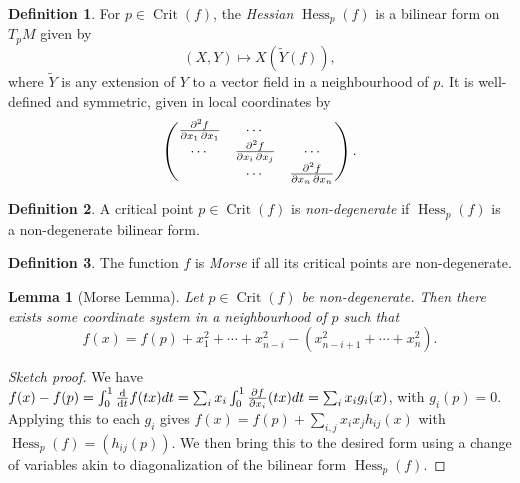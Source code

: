\documentclass{article}
\newtheorem*{lemma}{Lemma}
\theoremstyle{definition}
\newtheorem*{definition}{Definition}
\DeclareMathOperator{\Crit}{Crit}
\DeclareMathOperator{\Hess}{Hess}
\begin{document}
\begin{definition}
    For $p\in\Crit(f)$, the \emph{Hessian} $\Hess_p(f)$ is a bilinear form on
    $T_pM$ given by
    \begin{equation*}
        (X,Y) \mapsto X(\widetilde Y(f)),
    \end{equation*}
    where $\widetilde Y$ is any extension of $Y$ to a vector field in a
    neighbourhood of $p$. It is well-defined and symmetric, given in local
    coordinates by
    \begin{equation*}
        \begin{pmatrix}
            \pdv{f}{x_1,x_1} & \cdots & \\
            \cdots & \pdv{f}{x_i,x_j} & \cdots \\
                   & \cdots & \pdv{f}{x_n,x_n}
        \end{pmatrix}.
    \end{equation*}
\end{definition}

\begin{definition}
    A critical point $p\in\Crit(f)$ is \emph{non-degenerate} if
    $\Hess_p(f)$ is a non-degenerate bilinear form.
\end{definition}

\begin{definition}
    The function $f$ is \emph{Morse} if all its critical points are
    non-degenerate.
\end{definition}

\begin{lemma}[Morse Lemma]
    Let $p\in\Crit(f)$ be non-degenerate. Then there exists some coordinate
    system in a neighbourhood of $p$ such that
    \begin{equation*}
        f(x) = f(p)
            + x_1^2 + \cdots + x_{n-i}^2 - (x_{n-i+1}^2 + \cdots + x_n^2).
    \end{equation*}
\end{lemma}

\begin{proof}[Sketch proof]
    We have $f(x)-f(p)=\int_0^1\odv{}{t}f(tx)dt
    =\sum_ix_i\int_0^1\pdv{f}{x_i}(tx)dt=\sum_ix_ig_i(x)$, with $g_i(p)=0$.
    Applying this to each $g_i$ gives $f(x)=f(p)+\sum_{i,j}x_ix_jh_{ij}(x)$ with
    $\Hess_p(f)=(h_{ij}(p))$. We then bring this to the desired form using a
    change of variables akin to diagonalization of the bilinear form
    $\Hess_p(f)$.
\end{proof}
\end{document}
